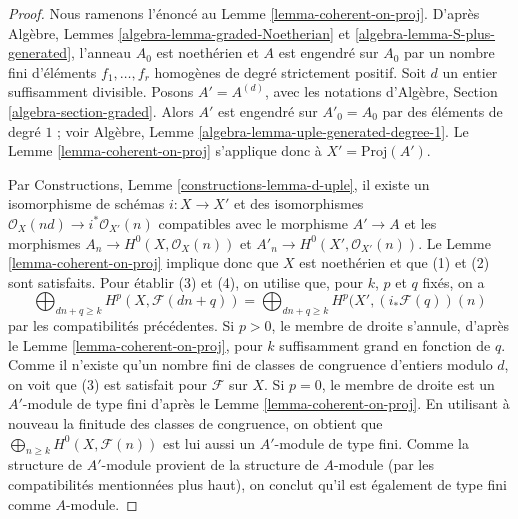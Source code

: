 \begin{proof}
Nous ramenons l'énoncé au Lemme \ref{lemma-coherent-on-proj}. D'après Algèbre,
Lemmes \ref{algebra-lemma-graded-Noetherian} et
\ref{algebra-lemma-S-plus-generated}, l'anneau $A_0$ est noethérien et $A$ est
engendré sur $A_0$ par un nombre fini d'éléments
$f_1, \ldots, f_r$ homogènes de degré strictement positif. Soit $d$ un entier
suffisamment divisible. Posons $A' = A^{(d)}$, avec les notations d'Algèbre,
Section \ref{algebra-section-graded}. Alors $A'$ est engendré sur
$A'_0 = A_0$ par des éléments de degré $1$ ; voir Algèbre, Lemme
\ref{algebra-lemma-uple-generated-degree-1}. Le Lemme
\ref{lemma-coherent-on-proj} s'applique donc à $X' = \text{Proj}(A')$.

\medskip\noindent
Par Constructions, Lemme \ref{constructions-lemma-d-uple}, il existe un
isomorphisme de schémas $i : X \to X'$ et des isomorphismes
$\mathcal{O}_X(nd) \to i^*\mathcal{O}_{X'}(n)$ compatibles avec le morphisme
$A' \to A$ et les morphismes
$A_n \to H^0(X, \mathcal{O}_X(n))$ et $A'_n \to H^0(X', \mathcal{O}_{X'}(n))$.
Le Lemme \ref{lemma-coherent-on-proj} implique donc que $X$ est noethérien et
que (1) et (2) sont satisfaits. Pour établir (3) et (4), on utilise que, pour
$k$, $p$ et $q$ fixés, on a
$$
\bigoplus\nolimits_{dn + q \geq k} H^p(X, \mathcal{F}(dn + q)) =
\bigoplus\nolimits_{dn + q \geq k} H^p(X', (i_*\mathcal{F}(q))(n)
$$
par les compatibilités précédentes. Si $p > 0$, le membre de droite s'annule,
d'après le Lemme \ref{lemma-coherent-on-proj}, pour $k$ suffisamment grand en
fonction de $q$. Comme il n'existe qu'un nombre fini de classes de congruence
d'entiers modulo $d$, on voit que (3) est satisfait pour $\mathcal{F}$ sur $X$.
Si $p = 0$, le membre de droite est un $A'$-module de type fini d'après le Lemme
\ref{lemma-coherent-on-proj}. En utilisant à nouveau la finitude des classes
de congruence, on obtient que
$\bigoplus_{n \geq k} H^0(X, \mathcal{F}(n))$ est lui aussi un $A'$-module de type fini.
Comme la structure de $A'$-module provient de la structure de $A$-module (par
les compatibilités mentionnées plus haut), on conclut qu'il est également de type fini
comme $A$-module.
\end{proof}

